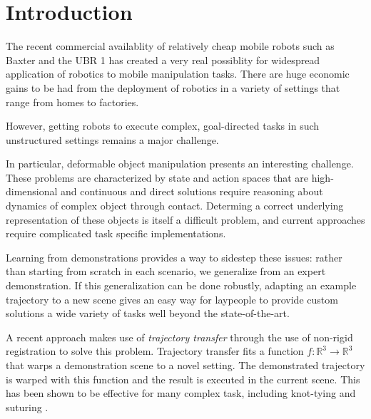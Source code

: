\section{Introduction}

The recent commercial availablity of relatively cheap mobile robots such as
Baxter and the UBR 1 has created a very real possiblity for widespread
application of robotics to mobile manipulation tasks.  There are huge economic
gains to be had from the deployment of robotics in a variety of settings that
range from homes to factories.  


However, getting robots to execute complex,
goal-directed tasks in such unstructured settings remains a major challenge.

In particular, deformable object manipulation presents an interesting challenge.
These problems are characterized by state and action spaces that are high-dimensional 
and continuous and direct solutions require reasoning about dynamics of complex object 
through contact.
Determing a correct underlying representation of these objects is itself a difficult problem,
and current approaches require complicated task specific implementations.


 
Learning from demonstrations provides a way to sidestep these issues: rather
than starting from scratch in each scenario, we generalize from an expert
demonstration.  If this generalization can be done robustly, adapting an example
trajectory to a new scene gives an easy way for laypeople to provide custom
solutions a wide variety of tasks well beyond the state-of-the-art.

A recent approach makes use of \emph{trajectory transfer} through the use of
non-rigid registration to solve this problem.  Trajectory transfer fits a
function $f:\mathbb{R}^3 \rightarrow \mathbb{R}^3$ that warps a demonstration
scene to a novel setting.  The demonstrated trajectory is warped with this
function and the result is executed in the current scene.  This has been shown
to be effective for many complex task, including knot-tying and suturing
\cite{Schulmanetal_ISRR2013, Schulmanetal_IROS2013}.

